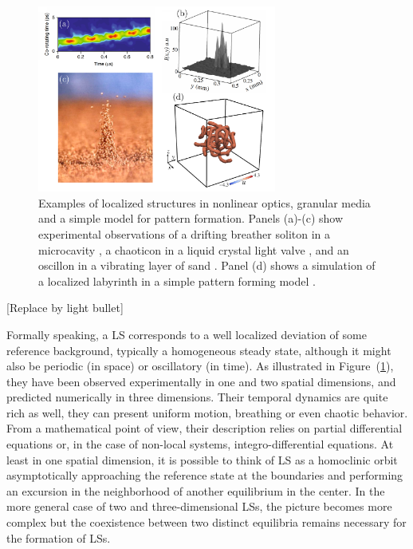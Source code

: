 \begin{figure}[h]
    \centering
    \includegraphics[width=0.7\textwidth]{imagenes/framework/LS/examples_ls.pdf}
    \caption{Examples of localized structures in nonlinear optics, granular media and a simple
    model for pattern formation. Panels (a)-(c) show experimental observations of a drifting breather
    soliton in a microcavity \cite{yi2018imaging}, a chaoticon in a liquid crystal light valve \cite{verschueren2013spatiotemporal}, and an oscillon in a vibrating
    layer of sand \cite{umbanhowar1996localized,aranson2006patterns}. Panel (d) shows a simulation of a localized labyrinth
    in a simple pattern forming model \cite{clerc2021localised, clerc2022localized}.}
    \label{fig:pre_ls_examplesls}
\end{figure}

[Replace by light bullet]

Formally speaking, a LS corresponds to a well localized deviation of some reference background,
typically a homogeneous steady state, although it might also be periodic (in space) or oscillatory (in time).
As illustrated in Figure~(\ref{fig:pre_ls_examplesls}), they have been observed experimentally in one and two spatial dimensions, and predicted numerically in three dimensions.
Their temporal dynamics are quite rich as well, they can present uniform motion, breathing or even chaotic behavior.
From a mathematical point of view, their description relies on partial differential equations or,
in the case of non-local systems, integro-differential equations. At least in one spatial dimension,
it is possible to think of LS as a homoclinic orbit asymptotically approaching the reference state
at the boundaries and performing an excursion in the neighborhood of another equilibrium in the center.
In the more general case of two and three-dimensional LSs, the picture becomes more complex but the
coexistence between two distinct equilibria remains necessary for the formation of LSs.

